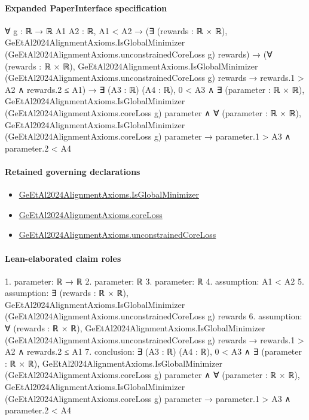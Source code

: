 \documentclass[10pt]{article}
\begin{document}
\paragraph{Expanded PaperInterface specification}
\begin{ReviewVerbatim}
∀ {g : ℝ → ℝ} {A1 A2 : ℝ},
  A1 < A2 →
    (∃ (rewards : ℝ × ℝ),
        GeEtAl2024AlignmentAxioms.IsGlobalMinimizer (GeEtAl2024AlignmentAxioms.unconstrainedCoreLoss g) rewards) →
      (∀ (rewards : ℝ × ℝ),
          GeEtAl2024AlignmentAxioms.IsGlobalMinimizer (GeEtAl2024AlignmentAxioms.unconstrainedCoreLoss g) rewards →
            rewards.1 > A2 ∧ rewards.2 ≤ A1) →
        ∃ (A3 : ℝ) (A4 : ℝ),
          0 < A3 ∧
            ∃ (parameter : ℝ × ℝ),
              GeEtAl2024AlignmentAxioms.IsGlobalMinimizer (GeEtAl2024AlignmentAxioms.coreLoss g) parameter ∧
                ∀ (parameter : ℝ × ℝ),
                  GeEtAl2024AlignmentAxioms.IsGlobalMinimizer (GeEtAl2024AlignmentAxioms.coreLoss g) parameter →
                    parameter.1 > A3 ∧ parameter.2 < A4
\end{ReviewVerbatim}

\paragraph{Retained governing declarations}
\begin{itemize}\raggedright
\item \hyperlink{governing-declaration-b949f8b742cc6742}{Ge\allowbreak{}Et\allowbreak{}Al2024\allowbreak{}Alignment\allowbreak{}Axioms.\allowbreak{}Is\allowbreak{}Global\allowbreak{}Minimizer}
\item \hyperlink{governing-declaration-009b8ab63bc34e01}{Ge\allowbreak{}Et\allowbreak{}Al2024\allowbreak{}Alignment\allowbreak{}Axioms.\allowbreak{}core\allowbreak{}Loss}
\item \hyperlink{governing-declaration-14e1ac9219427386}{Ge\allowbreak{}Et\allowbreak{}Al2024\allowbreak{}Alignment\allowbreak{}Axioms.\allowbreak{}unconstrained\allowbreak{}Core\allowbreak{}Loss}
\end{itemize}
\paragraph{Lean-elaborated claim roles}\begin{ReviewVerbatim}
1. parameter: ℝ → ℝ
2. parameter: ℝ
3. parameter: ℝ
4. assumption: A1 < A2
5. assumption: ∃ (rewards : ℝ × ℝ),
  GeEtAl2024AlignmentAxioms.IsGlobalMinimizer (GeEtAl2024AlignmentAxioms.unconstrainedCoreLoss g) rewards
6. assumption: ∀ (rewards : ℝ × ℝ),
  GeEtAl2024AlignmentAxioms.IsGlobalMinimizer (GeEtAl2024AlignmentAxioms.unconstrainedCoreLoss g) rewards →
    rewards.1 > A2 ∧ rewards.2 ≤ A1
7. conclusion: ∃ (A3 : ℝ) (A4 : ℝ),
  0 < A3 ∧
    ∃ (parameter : ℝ × ℝ),
      GeEtAl2024AlignmentAxioms.IsGlobalMinimizer (GeEtAl2024AlignmentAxioms.coreLoss g) parameter ∧
        ∀ (parameter : ℝ × ℝ),
          GeEtAl2024AlignmentAxioms.IsGlobalMinimizer (GeEtAl2024AlignmentAxioms.coreLoss g) parameter →
            parameter.1 > A3 ∧ parameter.2 < A4
\end{ReviewVerbatim}
\end{document}
